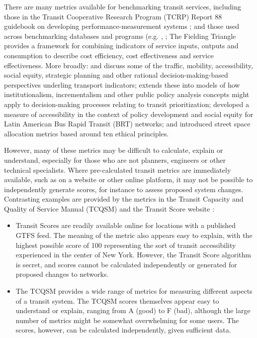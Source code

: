 \documentclass[preprint, 3p,
authoryear]{elsarticle} %
\begin{document}
There are many metrics available for benchmarking transit services,
including those in the Transit Cooperative Research Program (TCRP)
Report 88 guidebook on developing performance-measurement systems
\citep{Ryus:2003aa}; and those used across benchmarking databases and
programs (e.g. \citet{Florida-Transit-Information-System:2018aa},
\citet{UITP:2015aa} \citet{Imperial-College-London:2023aa}; The Fielding
Triangle \citep{FieldingGordonJ1987Mpts} provides a framework for
combining indicators of service inputs, outputs and consumption to
describe cost efficiency, cost effectiveness and service effectiveness.
More broadly: \citet{Litman:2003ab} and \citet{Litman:2016aa} discuss
some of the traffic, mobility, accessibility, social equity, strategic
planning and other rational decision-making-based perspectives underling
transport indicators; \citet{Reynolds:2017ah} extends these into models
of how institutionalism, incrementalism and other public policy analysis
concepts might apply to decision-making processes relating to transit
prioritization; \citet{GuzmanLuisA.2017Aeit} developed a measure of
accessibility in the context of policy development and social equity for
Latin American Bus Rapid Transit (BRT) networks; and
\citet{Creutzig2020streetspaceallocation} introduced street space
allocation metrics based around ten ethical principles.

However, many of these metrics may be difficult to calculate, explain or
understand, especially for those who are not planners, engineers or
other technical specialists. Where pre-calculated transit metrics are
immediately available, such as on a website or other online platform, it
may not be possible to independently generate scores, for instance to
assess proposed system changes. Contrasting examples are provided by the
metrics in the Transit Capacity and Quality of Service Manual (TCQSM)
and the Transit Score website \citep{WalkScore:2023tg}:

\begin{itemize}
\item
  Transit Scores are readily available online for locations with a
  published GTFS feed. The meaning of the metric also appears easy to
  explain, with the highest possible score of 100 representing the sort
  of transit accessibility experienced in the center of New York.
  However, the Transit Score algorithm is secret, and scores cannot be
  calculated independently or generated for proposed changes to
  networks.
\item
  The TCQSM provides a wide range of metrics for measuring different
  aspects of a transit system. The TCQSM scores themselves appear easy
  to understand or explain, ranging from A (good) to F (bad), although
  the large number of metrics might be somewhat overwhelming for some
  users. The scores, however, can be calculated independently, given
  sufficient data.
\end{itemize}
\end{document}
